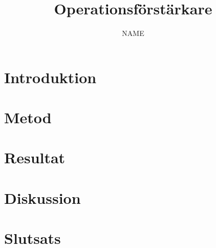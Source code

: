 \documentclass[a4paper, 10pt]{article}
\title{Operationsförstärkare} %
\author{NAME} %
\begin{document}
\thispagestyle{empty}
\setcounter{page}{0}
\maketitle
\newpage
\begin{abstract}
    \lipsum[1-2]
\end{abstract}
\newpage
\tableofcontents
\newpage

\begin{multicols}{2}

\section{Introduktion}
\section{Metod}
\section{Resultat}
\section{Diskussion}
\section{Slutsats}
\end{multicols}
\printbibliography
\end{document}
